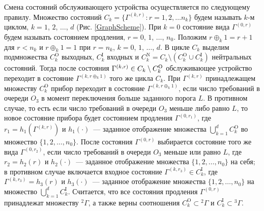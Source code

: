 \documentclass[a4paper,12pt,russian]{extarticle}
\newcommand{\G}{\Gamma}
\newcommand{\ga}[1]{\Gamma^{\left( #1 \right)} }
\begin{document}
Смена состояний обслуживающего устройства осуществляется по следующему правилу. Множество состояний $C_k = \{\G^{(k,r)} \colon r=1,2,\ldots n_k\}$ будем называть $k$-м циклом, $k=1$, $2$, $\ldots$, $d$ (Рис. \ref{GraphScheme}). При $k=0$ состояние вида $\ga{0,r}$ будем называть состоянием продления, $r=0$, $1$, $\ldots$, $n_0$. Положим $r \oplus_k 1 = r+1$ для $r<n_k$ и $r \oplus_k 1 = 1$ при $r=n_k$, $k = 0$, $1$, $\ldots$, $d$. В цикле $C_k$ выделим подмножества $C_k^{\mathrm{O}}$ выходных, $C_k^{\mathrm{I}}$ входных и $C_k^{\mathrm{N}} = C_k \setminus (C_k^{\mathrm{O}} \cup C_k^{\mathrm{I}})$ нейтральных состояний. Тогда после состояния $\ga{k,r} \hm\in C_k\setminus C_k^{\mathrm{O}}$ обслуживающее устройство переходит в состояние $\ga{k,r \oplus_k 1}$ того же цикла $C_k$. При $\ga{k,r}$ принадлежащем множеству $C_k^{\mathrm{O}}$ прибор переходит в состояние $\ga{k,r\oplus_k 1}$, если число требований в очереди $O_3$ в момент переключения больше заданного порога $L$. В противном случае, то есть если число требований в очереди $O_3$ меньше либо равно $L$, то новое состояние прибора будет состоянием продления $\ga{0,r_1}$, где $r_1=h_1(\ga{k,r})$ и $h_1(\cdot)$~--- заданное отображение множества $\bigcup\limits_{k=1}^d C_k^{\mathrm{O}}$ во множество $\{1,2,\ldots, n_0\}$. После состояния $\ga{0,r}$ выбирается состояние того же вида $\ga{0,r_2}$, если число требований в очереди $O_3$ меньше или равно $L$, где $r_2=h_2(r)$ и $h_2(\cdot)$~--- заданное отображение множества $\{1,2, \ldots, n_0\}$ на себя; в противном случае включается входное состояние $\ga{k,r_3} \in C_k^{\mathrm{I}}$, где $\ga{k,r_3}=h_3(r)$ и $h_3(\cdot)$~--- заданное отображение множества $\{1,2, \ldots, n_0\}$ на множество  $\bigcup\limits_{k=1}^d C_k^{\mathrm{I}}$. Считается, что все состояния продления $\ga{0,r}$ принадлежат множеству ${}^2 \G$, а также верны соотношения $C_k^\mathrm{O}\subset {}^2 \G$ и $C_k^\mathrm{I}\subset {}^3 \G$.
\end{document}
